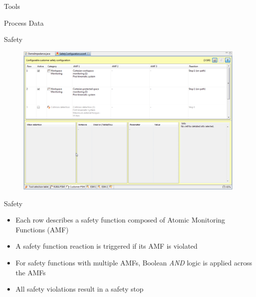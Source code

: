 \documentclass{beamer}
\begin{document}
\begin{frame}[fragile]{Tools}
\end{frame}

\begin{frame}[fragile]{Process Data}
\end{frame}

\begin{frame}{Safety}
  \begin{figure}
    \includegraphics[width=\textwidth]{sunrise-workbench-safety}
  \end{figure}
\end{frame}

\begin{frame}{Safety}
  \begin{block}{}
    \begin{itemize}
      \item Each row describes a safety function composed of Atomic Monitoring Functions (AMF)
      \item A safety function reaction is triggered if its AMF is violated
      \item For safety functions with multiple AMFs, Boolean \textit{AND} logic is applied across the AMFs
      \item All safety violations result in a safety stop
    \end{itemize}
  \end{block}
\end{frame}
\end{document}
